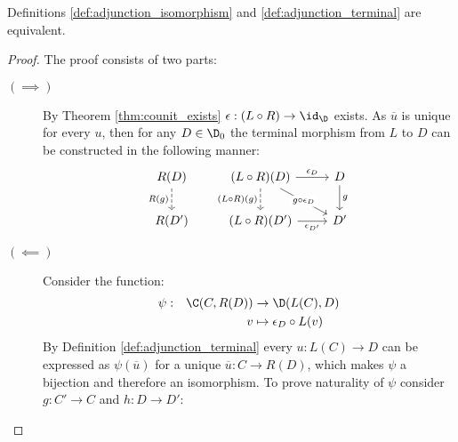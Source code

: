 \begin{theorem}
  Definitions \ref{def:adjunction_isomorphism} and \ref{def:adjunction_terminal}
  are equivalent.

  \begin{proof}
    The proof consists of two parts:
    \begin{description}
      \item[$(\implies)$] By Theorem \ref{thm:counit_exists} $\epsilon:(L\circ
        R) \to \id_\D$ exists. As $\overline{u}$ is unique for every $u$, then
        for any $D\in\D_0$ the terminal morphism from $L$ to $D$ can be
        constructed in the following manner:
        \[\begin{tikzcd}[ampersand replacement=\&]
          {R(D)} \& {(L\circ R)(D)} \& D \\
          {R(D')} \& {(L\circ R)(D')} \& {D'}
          \arrow["{\epsilon_D}", from=1-2, to=1-3]
          \arrow["{\epsilon_{D'}}"', from=2-2, to=2-3]
          \arrow["g", from=1-3, to=2-3]
          \arrow["{R(g)}"', dashed, from=1-1, to=2-1]
          \arrow["{g\circ \epsilon_D}"{description}, from=1-2, to=2-3]
          \arrow["{(L\circ R)(g)}"', dashed, from=1-2, to=2-2]
        \end{tikzcd}\]
      \item[$(\impliedby)$] Consider the function:
        \[
          \begin{aligned}
            \psi:&&\C(C, R(D)) &\to \D(L(C), D)\\
            &&v&\mapsto \epsilon_D\circ L(v)
          \end{aligned}
        \]
        By Definition \ref{def:adjunction_terminal} every $u:L(C)\to D$ can be
        expressed as $\psi(\overline{u})$ for a unique $\overline{u}:C\to R(D)$,
        which makes $\psi$ a bijection and therefore an isomorphism. To prove
        naturality of $\psi$ consider $g:C'\to C$ and $h:D\to D'$:

\end{description}
\end{proof}
\end{theorem}
